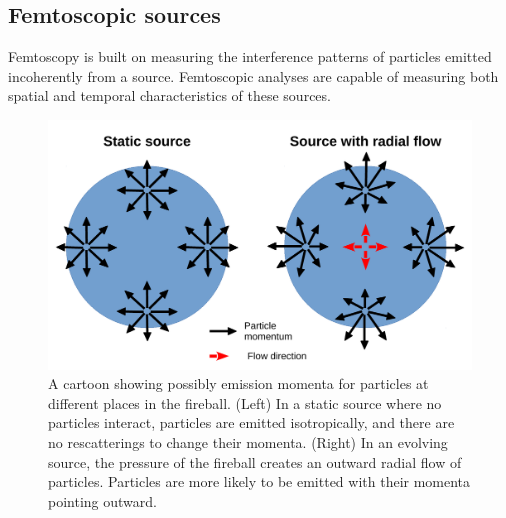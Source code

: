 \subsection{Femtoscopic sources}
\label{sec:FemtoSources}

Femtoscopy is built on measuring the interference patterns of particles emitted incoherently from a source.
Femtoscopic analyses are capable of measuring both spatial and temporal characteristics of these sources.

\begin{figure}[hbt]
\includegraphics[width=36pc]{Figures/HomemadeFigures/FlowAndMomentum.pdf}
\caption[Effect of radial flow on momentum]{A cartoon showing possibly emission momenta for particles at different places in the fireball.
(Left) In a static source where no particles interact, particles are emitted isotropically, and there are no rescatterings to change their momenta.
(Right) In an evolving source, the pressure of the fireball creates an outward radial flow of particles.
Particles are more likely to be emitted with their momenta pointing outward.}
\label{fig:FlowAndMomentum}
\end{figure}

